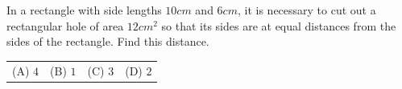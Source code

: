 In a rectangle with side lengths $10cm$ and $6cm$, it is necessary to cut out a rectangular hole of area $12cm^{2}$ so that its sides are at equal distances from the sides of the rectangle. Find this distance.



\begin{tabular}{llll}
(A) $4$ & (B) $1$ & (C) $3$ & (D) $2$
\end{tabular}
